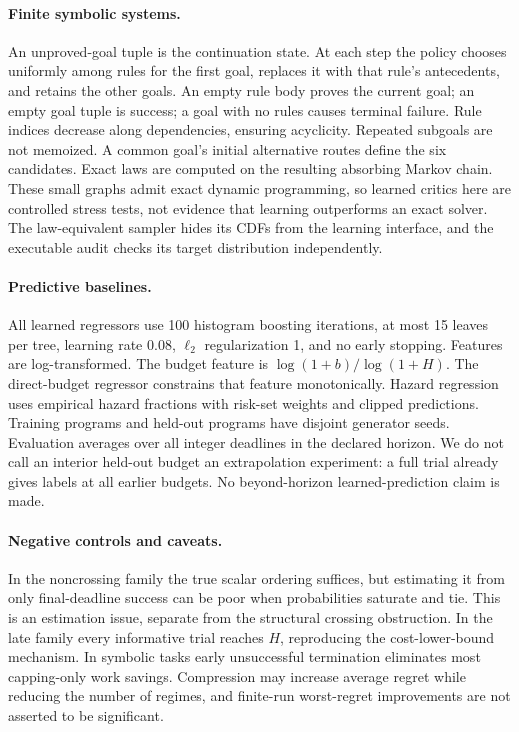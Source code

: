 \documentclass[11pt]{article}
\theoremstyle{definition}\newtheorem{definition}[theorem]{Definition}
\begin{document}
\paragraph{Finite symbolic systems.} An unproved-goal tuple is the continuation state. At each step the policy chooses uniformly among rules for the first goal, replaces it with that rule's antecedents, and retains the other goals. An empty rule body proves the current goal; an empty goal tuple is success; a goal with no rules causes terminal failure. Rule indices decrease along dependencies, ensuring acyclicity. Repeated subgoals are not memoized. A common goal's initial alternative routes define the six candidates. Exact laws are computed on the resulting absorbing Markov chain. These small graphs admit exact dynamic programming, so learned critics here are controlled stress tests, not evidence that learning outperforms an exact solver. The law-equivalent sampler hides its CDFs from the learning interface, and the executable audit checks its target distribution independently.

\paragraph{Predictive baselines.} All learned regressors use 100 histogram boosting iterations, at most 15 leaves per tree, learning rate 0.08, $\ell_2$ regularization 1, and no early stopping. Features are log-transformed. The budget feature is $\log(1+b)/\log(1+H)$. The direct-budget regressor constrains that feature monotonically. Hazard regression uses empirical hazard fractions with risk-set weights and clipped predictions. Training programs and held-out programs have disjoint generator seeds. Evaluation averages over all integer deadlines in the declared horizon. We do not call an interior held-out budget an extrapolation experiment: a full trial already gives labels at all earlier budgets. No beyond-horizon learned-prediction claim is made.

\paragraph{Negative controls and caveats.} In the noncrossing family the true scalar ordering suffices, but estimating it from only final-deadline success can be poor when probabilities saturate and tie. This is an estimation issue, separate from the structural crossing obstruction. In the late family every informative trial reaches $H$, reproducing the cost-lower-bound mechanism. In symbolic tasks early unsuccessful termination eliminates most capping-only work savings. Compression may increase average regret while reducing the number of regimes, and finite-run worst-regret improvements are not asserted to be significant.
\end{document}
